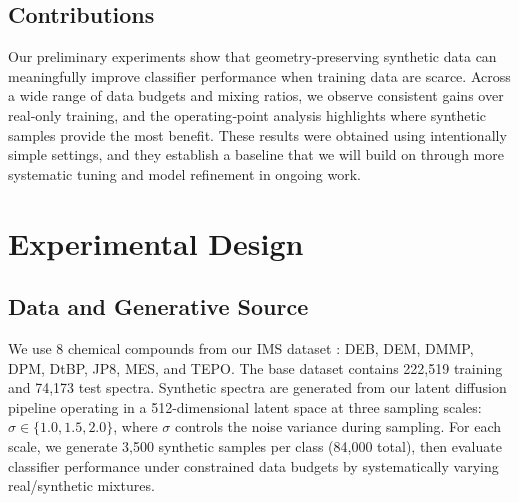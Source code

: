 \documentclass[conference]{IEEEtran}
\begin{document}
\subsection{Contributions}
Our preliminary experiments show that geometry‑preserving synthetic data can meaningfully improve classifier performance when training data are scarce. Across a wide range of data budgets and mixing ratios, we observe consistent gains over real‑only training, and the operating‑point analysis highlights where synthetic samples provide the most benefit. These results were obtained using intentionally simple settings, and they establish a baseline that we will build on through more systematic tuning and model refinement in ongoing work.

\section{Experimental Design}
\subsection{Data and Generative Source}
We use 8 chemical compounds from our IMS dataset \cite{dunham2024oracle}: DEB, DEM, DMMP, DPM, DtBP, JP8, MES, and TEPO. The base dataset contains 222,519 training and 74,173 test spectra. Synthetic spectra are generated from our latent diffusion pipeline operating in a 512-dimensional latent space at three sampling scales: $\sigma \in \{1.0, 1.5, 2.0\}$, where $\sigma$ controls the noise variance during sampling. For each scale, we generate 3,500 synthetic samples per class (84,000 total), then evaluate classifier performance under constrained data budgets by systematically varying real/synthetic mixtures.
\end{document}

